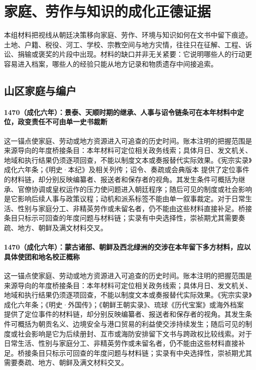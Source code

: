 \section{家庭、劳作与知识的成化正德证据}

本组材料把视线从朝廷决策移向家庭、劳作、环境与知识如何在文书中留下痕迹。土地、户籍、税役、河工、学校、宗教空间与地方灾情，往往只在征解、工程、诉讼、捐输或褒奖的片段中出现。材料的缺口并非无关紧要：它说明哪些人的行动更容易进入档案，哪些人的经验只能从地方记录和物质遗存中间接追索。

\subsection{山区家庭与编户}

\paragraph{1470（成化六年）：景泰、天顺时期的继承、人事与诏令链条可在本年材料中定位，政变责任不可由单一史书裁断} 这一锚点使家庭、劳动或地方资源进入可追查的历史时间。账本注明的把握范围是来源导向的年度桥接条目：本年材料可定位相关政务线索；具体月日、发文机关、地域和执行结果仍须逐项回查，不能以制度文本或奏报替代实际效果。《宪宗实录》成化六年条；《明史·本纪》及相关列传；诏令、奏疏或会典版本 提供了定位事件的材料链，却分别反映编纂者、报送者和保存者的视角。其发生条件可概括为继承、官僚协调或皇权运作的压力使问题进入朝廷程序；随后可见的制度或社会影响是它影响后续人事与政策议程；动机和派系标签不能由单一叙事裁定。对于日常生活、性别与家庭分工、非精英劳作或未留名者，仍不能由这些材料直接补足。桥接条目只标示可回查的年度问题与材料链；实录有中央选择性，崇祯期尤其需要奏疏、地方、朝鲜及满文材料交叉。

\paragraph{1470（成化六年）：蒙古诸部、朝鲜及西北绿洲的交涉在本年留下多方材料，应以具体使团和地名校正概称} 这一锚点使家庭、劳动或地方资源进入可追查的历史时间。账本注明的把握范围是来源导向的年度桥接条目：本年材料可定位相关政务线索；具体月日、发文机关、地域和执行结果仍须逐项回查，不能以制度文本或奏报替代实际效果。《宪宗实录》成化六年条；《明史·外国传》；《朝鲜王朝实录》、琉球《历代宝案》或海外档案 提供了定位事件的材料链，却分别反映编纂者、报送者和保存者的视角。其发生条件可概括为朝贡名义、边境安全与港口贸易的利益使交涉持续发生；随后可见的制度或社会影响是它为后续册封、互市或海防安排留下文书与跨政权比较线索。对于日常生活、性别与家庭分工、非精英劳作或未留名者，仍不能由这些材料直接补足。桥接条目只标示可回查的年度问题与材料链；实录有中央选择性，崇祯期尤其需要奏疏、地方、朝鲜及满文材料交叉。

